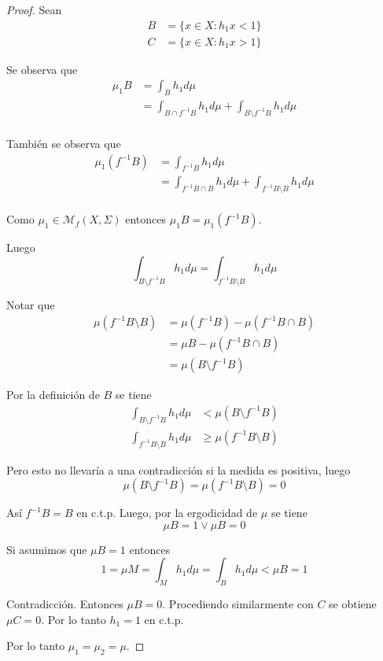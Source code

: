 \begin{proof}
	Sean
	\begin{align}
		B &= \{ x \in X: h_1 x < 1 \}\\
		C &= \{ x \in X: h_1 x > 1 \}
	\end{align}
	
	Se observa que
	\begin{align}
		\mu_1 B &= \int_B h_1 d\mu\\
		&= \int_{B \cap f^{-1}B} h_1 d\mu + \int_{B \setminus f^{-1}B} h_1 d\mu\\
	\end{align}
	
	También se observa que
	\begin{align}
		\mu_1(f^{-1}B) &= \int_{f^{-1}B} h_1 d\mu\\
		&= \int_{f^{-1}B \cap B} h_1 d\mu + \int_{f^{-1}B \setminus B} h_1 d\mu\\
	\end{align}
	
	Como $\mu_1 \in \mathcal{M}_f(X,\Sigma)$ entonces $\mu_1 B = \mu_1(f^{-1}B)$.
	
	Luego
	\begin{equation}
		\int_{B \setminus f^{-1}B} h_1 d\mu = \int_{f^{-1}B \setminus B} h_1 d\mu
	\end{equation}
	
	Notar que
	\begin{align}
		\mu(f^{-1}B \setminus B) &= \mu(f^{-1}B) - \mu(f^{-1}B \cap B)\\
		&= \mu B - \mu(f^{-1}B \cap B)\\
		&= \mu(B \setminus f^{-1}B)
	\end{align}
	
	Por la definición de $B$ se tiene
	\begin{align}
		\int_{B \setminus f^{-1}B} h_1 d\mu &< \mu(B \setminus f^{-1}B)\\
		\int_{f^{-1}B \setminus B} h_1 d\mu &\geq \mu(f^{-1}B \setminus B)
	\end{align}
	
	Pero esto no llevaría a una contradicción si la medida es positiva, luego
	\begin{equation}
		\mu(B \setminus f^{-1}B) = \mu(f^{-1}B \setminus B) = 0
	\end{equation}
	
	Así $f^{-1}B=B$ en c.t.p. Luego, por la ergodicidad de $\mu$ se tiene
	\begin{equation}
		\mu B = 1 \vee \mu B = 0
	\end{equation}
	
	Si asumimos que $\mu B = 1$ entonces
	\begin{equation}
		1 = \mu M = \int_M h_1 d\mu = \int_B h_1 d\mu < \mu B = 1
	\end{equation}
	
	Contradicción. Entonces $\mu B = 0$. Procediendo similarmente con $C$ se obtiene $\mu C = 0$. Por lo tanto $h_1 = 1$ en c.t.p.
	
	Por lo tanto $\mu_1=\mu_2=\mu$.
\end{proof}

